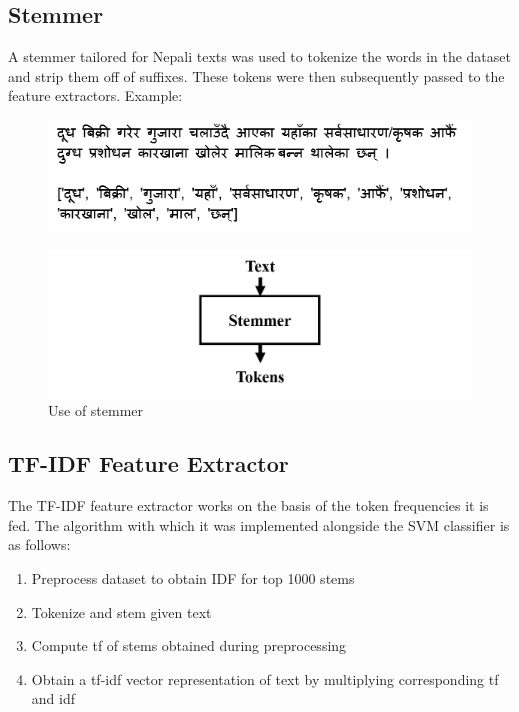 \documentclass[fleqn --11pt --twoside]{IOEGC2016} %
\begin{document}
\subsection{Stemmer}
A stemmer tailored for Nepali texts was used to tokenize the words in the dataset and strip them off of suffixes. These tokens were then subsequently passed to the feature extractors.
Example:

\begin{figure}[!h]
\centering
\includegraphics[width=\linewidth]{assets/example}
\end{figure}

\begin{figure}[!ht]
\centering
\includegraphics[width=\linewidth]{assets/stemmer}
\caption{Use of stemmer}
\label{fig:stemmer}
\end{figure}





\subsection{TF-IDF Feature Extractor}
The TF-IDF feature extractor works on the basis of the token frequencies it is fed. The algorithm with which it was implemented alongside the SVM classifier is as follows:
\begin{enumerate}
\item Preprocess dataset to obtain IDF for top 1000 stems
\item Tokenize and stem given text
\item Compute tf of stems obtained during preprocessing
\item Obtain a tf-idf vector representation of text by multiplying corresponding tf and idf
\end{enumerate}
\end{document}
